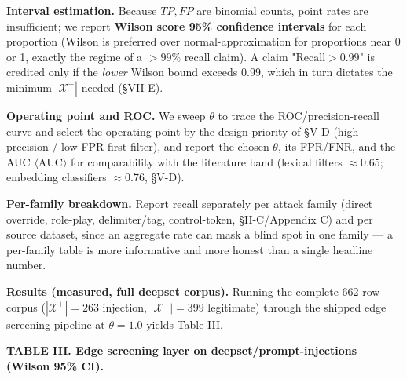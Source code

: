 \textbf{Interval estimation.} Because \(TP,FP\) are binomial counts,
point rates are insufficient; we report \textbf{Wilson score 95\%
confidence intervals} for each proportion (Wilson is preferred over
normal-approximation for proportions near 0 or 1, exactly the regime of
a \(>99\%\) recall claim). A claim "\(\text{Recall}>0.99\)" is credited
only if the \emph{lower} Wilson bound exceeds 0.99, which in turn
dictates the minimum \(|\mathcal{X}^{+}|\) needed (§VII-E).

\textbf{Operating point and ROC.} We sweep \(\theta\) to trace the
ROC/precision-recall curve and select the operating point by the design
priority of §V-D (high precision / low FPR first filter), and report the
chosen \(\theta\), its FPR/FNR, and the AUC \(\langle\text{AUC}\rangle\)
for comparability with the literature band (lexical filters $\approx$0.65;
embedding classifiers $\approx$0.76, §V-D).

\textbf{Per-family breakdown.} Report recall separately per attack
family (direct override, role-play, delimiter/tag, control-token,
§II-C/Appendix C) and per source dataset, since an aggregate rate can
mask a blind spot in one family --- a per-family table is more
informative and more honest than a single headline number.

\textbf{Results (measured, full deepset corpus).} Running the complete
662-row corpus (\(|\mathcal{X}^{+}|=263\) injection,
\(|\mathcal{X}^{-}|=399\) legitimate) through the shipped edge screening
pipeline at \(\theta=1.0\) yields Table III.

\textbf{TABLE III. Edge screening layer on deepset/prompt-injections
(Wilson 95\% CI).}

{\def\LTcaptype{none} %
\begin{table}[!t]\centering\scriptsize
{}
\end{table}
}

